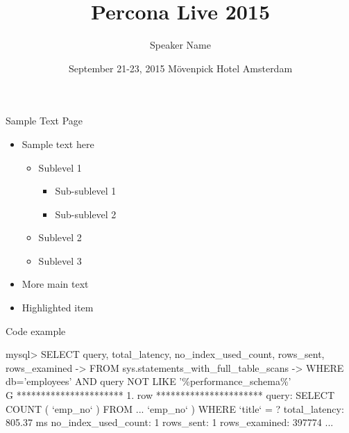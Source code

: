 \documentclass[aspectratio=169]{beamer}
\title[Percona Live Template HD]{Percona Live 2015}
\author{Speaker Name}
\date{September 21-23, 2015 Mövenpick Hotel  Amsterdam}
\begin{document}
        \begin{frame}
                \titlepage
        \end{frame}



        \begin{frame}{Sample Text Page}
                \begin{itemize}
                        \item Sample text here
                        \begin{itemize}
                                \item Sublevel 1
                                \begin{itemize}
                                	\item Sub-sublevel 1
                                	\item Sub-sublevel 2
                                \end{itemize}
                                \item Sublevel 2
                                \item Sublevel 3
                        \end{itemize}
                        \item More main text
                        \item \alert{Highlighted item}
                \end{itemize}
        \end{frame}
		
		\begin{frame}[fragile]{Code example}
			\begin{semiverbatim}
				mysql> SELECT query, total_latency, no_index_used_count, rows_sent, rows_examined
				    -> FROM sys.statements_with_full_table_scans 
				    -> WHERE db='employees' AND query NOT LIKE '\%performance_schema\%'\\G
				********************** 1. row **********************
				              query: SELECT COUNT ( `emp_no` ) FROM ...  `emp_no` ) WHERE `title` = ?
				      total_latency: 805.37 ms
				no_index_used_count: 1
				          rows_sent: 1
				      rows_examined: 397774
				...
			\end{semiverbatim}
		\end{frame}
		
\end{document}
